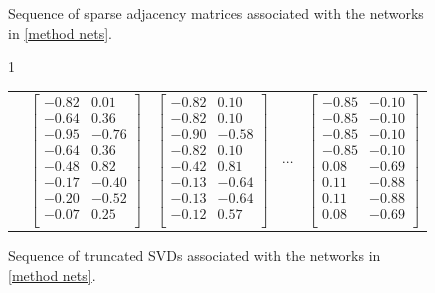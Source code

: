 \documentclass[12pt]{amsbook}
\begin{document}
\begin{figure}[H]
\begin{tabular}{llll}
        \end{tabular}
        \caption{Sequence of sparse adjacency matrices associated with the networks in \cref{method nets}.}
        \label{method adjacency}
    \end{figure}
        


    \begin{figure}[c]{1\textwidth}
        \begin{tabular}{m{} m{} m{} m{} l}
        &
            $\begin{bmatrix}
                -0.82  & 0.01\\
                -0.64  & 0.36\\
                -0.95 & -0.76\\
                -0.64 &  0.36\\
                -0.48 &  0.82\\
                -0.17 & -0.40\\
                -0.20 & -0.52\\
                -0.07 &  0.25\\
            \end{bmatrix}$
        
        &
        
            $\begin{bmatrix}
                -0.82  &  0.10\\
                -0.82  &  0.10\\
                -0.90 & -0.58\\
                -0.82  &  0.10\\
                -0.42 &  0.81\\
                -0.13  & -0.64\\
                -0.13  & -0.64\\
                -0.12 &  0.57\\
            \end{bmatrix}$
        
        &
        $\cdots$
        &
        
            $\begin{bmatrix}
                -0.85 &  -0.10\\
                -0.85 &  -0.10\\
                -0.85 &  -0.10\\
                -0.85 &  -0.10\\
                 0.08 &  -0.69\\
                 0.11 &  -0.88\\
                 0.11 &  -0.88\\
                 0.08 &  -0.69\\
            \end{bmatrix}$
        \end{tabular}
        \caption{Sequence of truncated SVDs associated with the networks in \cref{method nets}.}
        \label{method embed}
    \end{figure}
    
\end{document}

